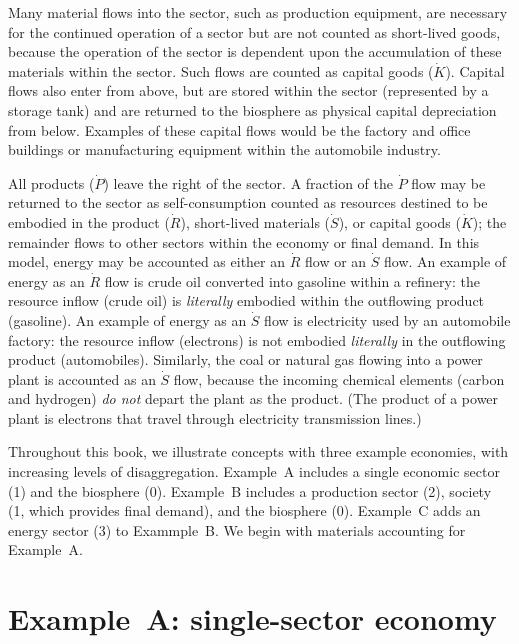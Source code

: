 Many material flows into the sector, such as production equipment,
are necessary for the continued operation of a sector 
but are not counted as short-lived goods, 
because the operation of the sector is dependent 
upon the accumulation of these materials within the sector. 
Such flows are counted as capital goods 
($\dot{K}$).
Capital flows also enter from above, 
but are stored within the sector (represented by a storage tank) 
and are returned to the biosphere as 
physical capital depreciation from below.
Examples of these capital flows would be the factory and office buildings or
manufacturing equipment within the automobile industry.

All products ($\dot{P}$) leave the right of the sector. 
A fraction of the $\dot{P}$ flow may be returned to the sector as self-consumption 
counted as resources destined to be embodied in the product ($\dot{R}$), 
short-lived materials ($\dot{S}$), or 
capital goods ($\dot{K}$); 
the remainder flows to other sectors within the economy or final demand. 
In this model, energy may be accounted
as either an $\dot{R}$ flow or an $\dot{S}$ flow.
An example of energy as an $\dot{R}$ flow is crude oil converted into
gasoline within a refinery: the resource inflow (crude oil) is
\emph{literally} embodied within the outflowing product (gasoline).
An example of energy as an $\dot{S}$ flow is electricity
used by an automobile factory: the resource inflow (electrons)
is not embodied \emph{literally} in the outflowing product (automobiles).
Similarly, the coal or natural gas flowing into a
power plant is accounted as an $\dot{S}$ flow, 
because the incoming chemical elements (carbon and hydrogen) \emph{do
not} depart the plant as the product.  
(The product of a power plant is electrons that travel through
electricity transmission lines.)

Throughout this book, we illustrate concepts with three example economies, 
with increasing levels of disaggregation. 
Example~A includes a single economic sector (1) and the biosphere (0).
Example~B includes a production sector (2), society (1, which provides final demand),
and the biosphere (0). 
Example~C adds an energy sector (3) to Exammple~B.
We begin with materials accounting for Example~A.


\section{Example~A: single-sector economy} %
\label{sec:A_materials}

